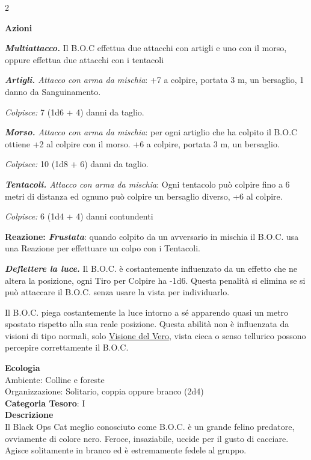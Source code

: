 \begin{multicols}{2}
{\textbf{Azioni}

\emph{\textbf{Multiattacco.}} Il B.O.C effettua due attacchi con artigli e uno con il morso, oppure effettua due attacchi con i tentacoli

\emph{\textbf{Artigli.} Attacco con arma da mischia}: +7 a colpire, portata 3 m, un bersaglio, 1 danno da Sanguinamento.

\emph{Colpisce:} 7 (1d6 + 4) danni da taglio.

\emph{\textbf{Morso.} Attacco con arma da mischia}: per ogni artiglio che ha colpito il B.O.C ottiene +2 al colpire con il morso. +6 a colpire, portata 3 m, un bersaglio.

\emph{Colpisce:} 10 (1d8 + 6) danni da taglio.

\emph{\textbf{Tentacoli.} Attacco con arma da mischia}: Ogni tentacolo può colpire fino a 6 metri di distanza ed ognuno può colpire un bersaglio diverso, +6 al colpire.

\emph{Colpisce:} 6 (1d4 + 4) danni contundenti

\textbf{Reazione: \emph{Frustata}}: quando colpito da un avversario in mischia il B.O.C. usa una Reazione per effettuare un colpo con i Tentacoli.

\emph{\textbf{Deflettere la luce.}} Il B.O.C. è costantemente influenzato da un effetto che ne altera la posizione, ogni Tiro per Colpire ha -1d6. Questa penalità si elimina se si può attaccare il B.O.C. senza usare la vista per individuarlo.

Il B.O.C. piega costantemente la luce intorno a sé apparendo quasi un metro spostato rispetto alla sua reale posizione. Questa abilità non è influenzata da visioni di tipo normali, solo \hyperlink{Visione del Vero}{Visione del Vero}, vista cieca o senso tellurico possono percepire correttamente il B.O.C.

\textbf{Ecologia}\\
Ambiente: Colline e foreste\\
Organizzazione: Solitario, coppia oppure branco (2d4)\\
\textbf{Categoria Tesoro}: I\\
\textbf{Descrizione}\\
Il Black Ops Cat meglio conosciuto come B.O.C. è un grande felino predatore, ovviamente di colore nero. Feroce, insaziabile, uccide per il gusto di cacciare. Agisce solitamente in branco ed è estremamente fedele al gruppo.

}
\end{multicols}
